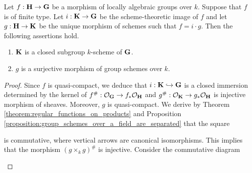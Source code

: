 \begin{theorem}\label{theorem:images_of_locally_algebraic_groups_homomorphisms}
Let $f:\bd{H}\ra \bd{G}$ be a morphism of locally algebraic groups over $k$. Suppose that $f$ is of finite type. Let $i:\bd{K}\ra \bd{G}$ be the scheme-theoretic image of $f$ and let $g:\bd{H}\ra \bd{K}$ be the unique morphism of schemes such that $f = i\cdot g$. Then the following assertions hold.
\begin{enumerate}[label=\emph{\textbf{(\arabic*)}}, leftmargin=3.0em]
\item $\bd{K}$ is a closed subgroup $k$-scheme of $\bd{G}$.
\item $g$ is a surjective morphism of group schemes over $k$.
\end{enumerate}
\end{theorem}
\begin{proof}
Since $f$ is quasi-compact, we deduce that $i:\bd{K} \hookrightarrow \bd{G}$ is a closed immersion determined by the kernel of $f^{\#}:\cO_{\bd{G}}\ra f_*\cO_{\bd{H}}$ and $g^{\#}:\cO_{\bd{K}}\ra g_*\cO_{\bd{H}}$ is injective morphism of sheaves. Moreover, $g$ is quasi-compact. We derive by Theorem \ref{theorem:regular_functions_on_products} and Proposition \ref{proposition:group_schemes_over_a_field_are_separated} that the square
\begin{center}
\end{center}
is commutative, where vertical arrows are canonical isomorphisms. This implies that the morphism $\left(g\times_k g\right)^{\#}$ is injective. Consider the commutative diagram
\begin{center}
\begin{tikzpicture}

\end{tikzpicture}
\end{center}
\end{proof}
